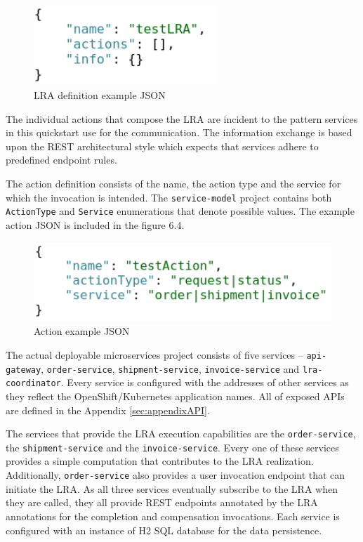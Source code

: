 \documentclass[oneside,
  digital, %
  table,   %
  nolof,     %
  nolot,     %
]{fithesis3}
\begin{document}
\begin{figure}
    \begin{center}
        \includegraphics[height=30mm]{images/LRADefinition.png}
    \end{center}
    \caption{LRA definition example JSON}
\end{figure}

The individual actions that compose the LRA are incident to the pattern services in this quickstart use for the communication. The information exchange is based upon the REST architectural style which expects that services adhere to predefined endpoint rules. 

The action definition consists of the name, the action type and the service for which the invocation is intended. The \texttt{service-model} project contains both \texttt{ActionType} and \texttt{Service} enumerations that denote possible values. The example action JSON is included in the figure 6.4.

\begin{figure}
    \begin{center}
        \includegraphics[height=30mm]{images/actionJSON.png}
    \end{center}
    \caption{Action example JSON}
\end{figure}

The actual deployable microservices project consists of five services -- \texttt{api-gateway}, \texttt{order-service}, \texttt{shipment-service}, \texttt{invoice-service} and \texttt{lra-coordinator}. Every service is configured with the addresses of other services as they reflect the OpenShift/Kubernetes application names. All of exposed APIs are defined in the Appendix \ref{sec:appendixAPI}.

The services that provide the LRA execution capabilities are the \texttt{order-service}, the \texttt{shipment-service} and the \texttt{invoice-service}. Every one of these services provides a simple computation that contributes to the LRA realization. Additionally, \texttt{order-service} also provides a user invocation endpoint that can initiate the LRA. As all three services eventually subscribe to the LRA when they are called, they all provide REST endpoints annotated by the LRA annotations for the completion and compensation invocations. Each service is configured with an instance of H2 SQL database for the data persistence.
\end{document}
